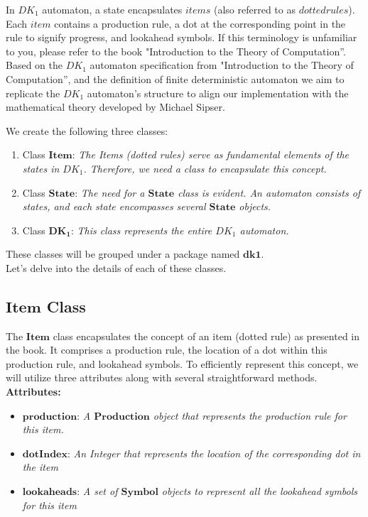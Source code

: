 In \( DK_{1} \) automaton, a state encapsulates \(items\) (also referred to as \(dotted rules\)). Each \(item\) contains a production rule, a dot at the corresponding point in the rule to signify progress, and lookahead symbols. If this terminology is unfamiliar to you, please refer to the book "Introduction to the Theory of Computation”.\\

Based on the \( DK_{1} \) automaton specification from "Introduction to the Theory of Computation”, and the definition of finite deterministic automaton we aim to replicate the \( DK_{1} \) automaton's structure to align our implementation with the mathematical theory developed by Michael Sipser.

We create the following three classes:
\begin{enumerate}
    \item Class \(\boldsymbol{Item}\): \textit{The Items (dotted rules) serve as fundamental elements of the states in \( DK_{1} \). Therefore, we need a class to encapsulate this concept.}
    \item Class \(\boldsymbol{State}\): \textit{The need for a \(\boldsymbol{State}\) class is evident. An automaton consists of states, and each state encompasses several \(\boldsymbol{State}\) objects.}
    \item Class \(\boldsymbol{DK_{1}}\): \textit{This class represents the entire \( DK_{1} \) automaton.}
\end{enumerate}

These classes will be grouped under a package named \(\boldsymbol{dk1}\).\\

Let’s delve into the details of each of these classes.

\subsection{\(\boldsymbol{Item}\) Class}

The \(\boldsymbol{Item}\) class encapsulates the concept of an item (dotted rule) as presented in the book. It comprises a production rule, the location of a dot within this production rule, and lookahead symbols. To efficiently represent this concept, we will utilize three attributes along with several straightforward methods.\\

\textbf{Attributes:}
\begin{itemize}
    \item \(\boldsymbol{production}\): \textit{A \(\boldsymbol{Production}\) object that represents the production rule for this item.}
    \item \(\boldsymbol{dotIndex}\): \textit{An Integer that represents the location of the corresponding dot in the item}
    \item \(\boldsymbol{lookaheads}\): \textit{A set of \(\boldsymbol{Symbol}\) objects to represent all the lookahead symbols for this item}
\end{itemize}

